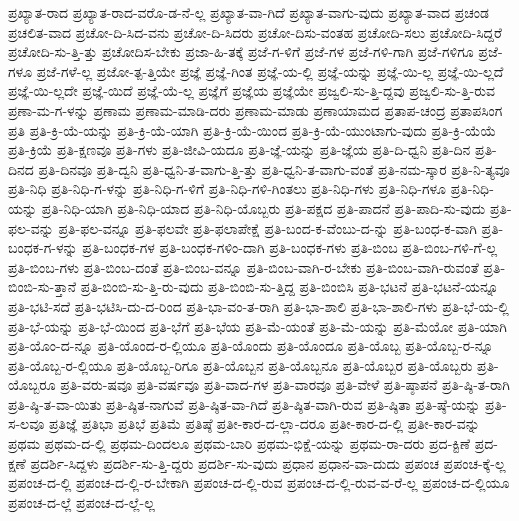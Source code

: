 {ಪ್ರಖ್ಯಾತ-ರಾದ
ಪ್ರಖ್ಯಾತ-ರಾದ-ವರೊ-ಡ-ನೆ-ಲ್ಲ
ಪ್ರಖ್ಯಾತ-ವಾ-ಗಿದೆ
ಪ್ರಖ್ಯಾತ-ವಾಗು-ವುದು
ಪ್ರಖ್ಯಾತ-ವಾದ
ಪ್ರಚಂಡ
ಪ್ರಚಲಿತ-ವಾದ
ಪ್ರಚೋ-ದಿ-ಸಿದ-ವನು
ಪ್ರಚೋ-ದಿ-ಸಿದರು
ಪ್ರಚೋ-ದಿಸು-ವಂತಹ
ಪ್ರಚೋದಿ-ಸಲು
ಪ್ರಚೋದಿ-ಸಿದ್ದರೆ
ಪ್ರಚೋದಿ-ಸು-ತ್ತಿ-ತ್ತು
ಪ್ರಚೋದಿಸ-ಬೇಕು
ಪ್ರಜಾ-ಹಿ-ತಕ್ಕೆ
ಪ್ರಜೆ-ಗ-ಳಿಗೆ
ಪ್ರಜೆ-ಗಳ
ಪ್ರಜೆ-ಗಳಿ-ಗಾಗಿ
ಪ್ರಜೆ-ಗಳಿಗೂ
ಪ್ರಜೆ-ಗಳೂ
ಪ್ರಜೆ-ಗಳೆ-ಲ್ಲ
ಪ್ರಜೋ-ತ್ಪ-ತ್ತಿಯೇ
ಪ್ರಜ್ಞೆ
ಪ್ರಜ್ಞೆ-ಗಿಂತ
ಪ್ರಜ್ಞೆ-ಯ-ಲ್ಲಿ
ಪ್ರಜ್ಞೆ-ಯನ್ನು
ಪ್ರಜ್ಞೆ-ಯಿ-ಲ್ಲ
ಪ್ರಜ್ಞೆ-ಯಿ-ಲ್ಲದೆ
ಪ್ರಜ್ಞೆ-ಯಿ-ಲ್ಲದೇ
ಪ್ರಜ್ಞೆ-ಯಿದೆ
ಪ್ರಜ್ಞೆ-ಯೆ-ಲ್ಲ
ಪ್ರಜ್ಞೆಗೆ
ಪ್ರಜ್ಞೆಯ
ಪ್ರಜ್ಞೆಯೇ
ಪ್ರಜ್ವಲಿ-ಸು-ತ್ತಿ-ದ್ದವು
ಪ್ರಜ್ವಲಿ-ಸು-ತ್ತಿ-ರುವ
ಪ್ರಣಾ-ಮ-ಗ-ಳನ್ನು
ಪ್ರಣಾಮ
ಪ್ರಣಾಮ-ಮಾಡಿ-ದರು
ಪ್ರಣಾಮ-ಮಾಡು
ಪ್ರಣಾಯಾಮದ
ಪ್ರತಾಪ-ಚಂದ್ರ
ಪ್ರತಾಪಸಿಂಗ
ಪ್ರತಿ
ಪ್ರತಿ-ಕ್ರಿ-ಯೆ-ಯನ್ನು
ಪ್ರತಿ-ಕ್ರಿ-ಯೆ-ಯಾಗಿ
ಪ್ರತಿ-ಕ್ರಿ-ಯೆ-ಯಿಂದ
ಪ್ರತಿ-ಕ್ರಿ-ಯೆ-ಯುಂಟಾಗು-ವುದು
ಪ್ರತಿ-ಕ್ರಿ-ಯೆಯೆ
ಪ್ರತಿ-ಕ್ರಿಯೆ
ಪ್ರತಿ-ಕ್ಷಣವೂ
ಪ್ರತಿ-ಗಳು
ಪ್ರತಿ-ಜೀವಿ-ಯದೂ
ಪ್ರತಿ-ಜ್ಞೆ-ಯನ್ನು
ಪ್ರತಿ-ಜ್ಞೆಯ
ಪ್ರತಿ-ದಿ-ಧ್ವನಿ
ಪ್ರತಿ-ದಿನ
ಪ್ರತಿ-ದಿನದ
ಪ್ರತಿ-ದಿನವೂ
ಪ್ರತಿ-ದ್ವನಿ
ಪ್ರತಿ-ಧ್ವನಿ-ತ-ವಾಗು-ತ್ತಿ-ತ್ತು
ಪ್ರತಿ-ಧ್ವನಿ-ತ-ವಾಗು-ವಂತೆ
ಪ್ರತಿ-ನಮ-ಸ್ಕಾರ
ಪ್ರತಿ-ನಿ-ತ್ಯವೂ
ಪ್ರತಿ-ನಿಧಿ
ಪ್ರತಿ-ನಿಧಿ-ಗ-ಳನ್ನು
ಪ್ರತಿ-ನಿಧಿ-ಗ-ಳಿಗೆ
ಪ್ರತಿ-ನಿಧಿ-ಗಳಿ-ಗಿಂತಲು
ಪ್ರತಿ-ನಿಧಿ-ಗಳು
ಪ್ರತಿ-ನಿಧಿ-ಗಳೂ
ಪ್ರತಿ-ನಿಧಿ-ಯನ್ನು
ಪ್ರತಿ-ನಿಧಿ-ಯಾಗಿ
ಪ್ರತಿ-ನಿಧಿ-ಯಾದ
ಪ್ರತಿ-ನಿಧಿ-ಯೊಬ್ಬರು
ಪ್ರತಿ-ಪಕ್ಷದ
ಪ್ರತಿ-ಪಾದನೆ
ಪ್ರತಿ-ಪಾದಿ-ಸು-ವುದು
ಪ್ರತಿ-ಫಲ-ವನ್ನು
ಪ್ರತಿ-ಫಲ-ವನ್ನೂ
ಪ್ರತಿ-ಫಲವೇ
ಪ್ರತಿ-ಫಲಾಪೇಕ್ಷೆ
ಪ್ರತಿ-ಬಂದ-ಕ-ವೆಂಬು-ದ-ನ್ನು
ಪ್ರತಿ-ಬಂಧ-ಕ-ವಾಗಿ
ಪ್ರತಿ-ಬಂಧಕ-ಗ-ಳನ್ನು
ಪ್ರತಿ-ಬಂಧಕ-ಗಳ
ಪ್ರತಿ-ಬಂಧಕ-ಗಳಿಂ-ದಾಗಿ
ಪ್ರತಿ-ಬಂಧಕ-ಗಳು
ಪ್ರತಿ-ಬಿಂಬ
ಪ್ರತಿ-ಬಿಂಬ-ಗಳಿ-ಗೆ-ಲ್ಲ
ಪ್ರತಿ-ಬಿಂಬ-ಗಳು
ಪ್ರತಿ-ಬಿಂಬ-ದಂತೆ
ಪ್ರತಿ-ಬಿಂಬ-ವನ್ನೂ
ಪ್ರತಿ-ಬಿಂಬ-ವಾಗಿ-ರ-ಬೇಕು
ಪ್ರತಿ-ಬಿಂಬ-ವಾಗಿ-ರುವಂತೆ
ಪ್ರತಿ-ಬಿಂಬಿ-ಸು-ತ್ತಾನೆ
ಪ್ರತಿ-ಬಿಂಬಿ-ಸು-ತ್ತಿ-ರು-ವುದು
ಪ್ರತಿ-ಬಿಂಬಿ-ಸು-ತ್ತಿದ್ದ
ಪ್ರತಿ-ಬಿಂಬಿಸಿ
ಪ್ರತಿ-ಭಟನೆ
ಪ್ರತಿ-ಭಟನೆ-ಯನ್ನೂ
ಪ್ರತಿ-ಭಟಿ-ಸದೆ
ಪ್ರತಿ-ಭಟಿಸಿ-ದು-ದ-ರಿಂದ
ಪ್ರತಿ-ಭಾ-ವಂ-ತ-ರಾಗಿ
ಪ್ರತಿ-ಭಾ-ಶಾಲಿ
ಪ್ರತಿ-ಭಾ-ಶಾಲಿ-ಗಳು
ಪ್ರತಿ-ಭೆ-ಯ-ಲ್ಲಿ
ಪ್ರತಿ-ಭೆ-ಯನ್ನು
ಪ್ರತಿ-ಭೆ-ಯಿಂದ
ಪ್ರತಿ-ಭೆಗೆ
ಪ್ರತಿ-ಭೆಯ
ಪ್ರತಿ-ಮೆ-ಯಂತೆ
ಪ್ರತಿ-ಮೆ-ಯನ್ನು
ಪ್ರತಿ-ಮೆಯೋ
ಪ್ರತಿ-ಯಾಗಿ
ಪ್ರತಿ-ಯೊಂ-ದ-ನ್ನೂ
ಪ್ರತಿ-ಯೊಂದ-ರ-ಲ್ಲಿಯೂ
ಪ್ರತಿ-ಯೊಂದು
ಪ್ರತಿ-ಯೊಂದೂ
ಪ್ರತಿ-ಯೊಬ್ಬ
ಪ್ರತಿ-ಯೊಬ್ಬ-ರ-ನ್ನೂ
ಪ್ರತಿ-ಯೊಬ್ಬ-ರ-ಲ್ಲಿಯೂ
ಪ್ರತಿ-ಯೊಬ್ಬ-ರಿಗೂ
ಪ್ರತಿ-ಯೊಬ್ಬನ
ಪ್ರತಿ-ಯೊಬ್ಬನೂ
ಪ್ರತಿ-ಯೊಬ್ಬರ
ಪ್ರತಿ-ಯೊಬ್ಬರು
ಪ್ರತಿ-ಯೊಬ್ಬರೂ
ಪ್ರತಿ-ವರು-ಷವೂ
ಪ್ರತಿ-ವರ್ಷವೂ
ಪ್ರತಿ-ವಾದ-ಗಳ
ಪ್ರತಿ-ವಾರವೂ
ಪ್ರತಿ-ವೇಳೆ
ಪ್ರತಿ-ಷ್ಠಾಪನೆ
ಪ್ರತಿ-ಷ್ಠಿ-ತ-ರಾಗಿ
ಪ್ರತಿ-ಷ್ಠಿ-ತ-ವಾ-ಯಿತು
ಪ್ರತಿ-ಷ್ಠಿತ-ನಾಗುವೆ
ಪ್ರತಿ-ಷ್ಠಿತ-ವಾ-ಗಿದೆ
ಪ್ರತಿ-ಷ್ಠಿತ-ವಾಗಿ-ರುವ
ಪ್ರತಿ-ಷ್ಠಿತಾ
ಪ್ರತಿ-ಷ್ಠೆ-ಯನ್ನು
ಪ್ರತಿ-ಸ-ಲವೂ
ಪ್ರತಿಜ್ಞೆ
ಪ್ರತಿಭಾ
ಪ್ರತಿಭೆ
ಪ್ರತಿಮೆ
ಪ್ರತಿಷ್ಠೆ
ಪ್ರತೀ-ಕಾರ-ದ-ಲ್ಲಾ-ದರೂ
ಪ್ರತೀ-ಕಾರ-ದ-ಲ್ಲಿ
ಪ್ರತೀ-ಕಾರ-ವನ್ನು
ಪ್ರಥಮ
ಪ್ರಥಮ-ದ-ಲ್ಲಿ
ಪ್ರಥಮ-ದಿಂದಲೂ
ಪ್ರಥಮ-ಬಾರಿ
ಪ್ರಥಮ-ಭಿಕ್ಷೆ-ಯನ್ನು
ಪ್ರಥಮ-ರಾ-ದರು
ಪ್ರದ-ಕ್ಟಿಣೆ
ಪ್ರದ-ಕ್ಷಣೆ
ಪ್ರದರ್ಶಿ-ಸಿದ್ದಳು
ಪ್ರದರ್ಶಿ-ಸು-ತ್ತಿ-ದ್ದರು
ಪ್ರದರ್ಶಿ-ಸು-ವುದು
ಪ್ರಧಾನ
ಪ್ರಧಾನ-ವಾ-ದುದು
ಪ್ರಪಂಚ
ಪ್ರಪಂಚ-ಕ್ಕೆ-ಲ್ಲ
ಪ್ರಪಂಚ-ದ-ಲ್ಲಿ
ಪ್ರಪಂಚ-ದ-ಲ್ಲಿ-ರ-ಬೇಕಾಗಿ
ಪ್ರಪಂಚ-ದ-ಲ್ಲಿ-ರುವ
ಪ್ರಪಂಚ-ದ-ಲ್ಲಿ-ರುವ-ವ-ರೆ-ಲ್ಲ
ಪ್ರಪಂಚ-ದ-ಲ್ಲಿಯೂ
ಪ್ರಪಂಚ-ದ-ಲ್ಲೆ
ಪ್ರಪಂಚ-ದ-ಲ್ಲೆ-ಲ್ಲ
}

